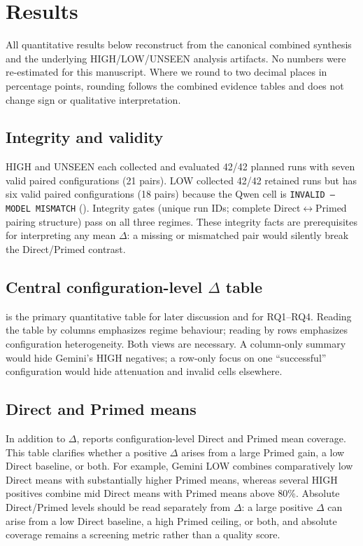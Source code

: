 \section{Results}
\label{sec:results}

All quantitative results below reconstruct from the canonical combined synthesis and the underlying HIGH/LOW/UNSEEN analysis artifacts.
No numbers were re-estimated for this manuscript.
Where we round to two decimal places in percentage points, rounding follows the combined evidence tables and does not change sign or qualitative interpretation.

\subsection{Integrity and validity}
HIGH and UNSEEN each collected and evaluated 42/42 planned runs with seven valid paired configurations (21 pairs).
LOW collected 42/42 retained runs but has six valid paired configurations (18 pairs) because the Qwen cell is \texttt{INVALID --- MODEL MISMATCH} ().
Integrity gates (unique run IDs; complete Direct$\leftrightarrow$Primed pairing structure) pass on all three regimes.
These integrity facts are prerequisites for interpreting any mean $\Delta$: a missing or mismatched pair would silently break the Direct/Primed contrast.

\subsection{Central configuration-level $\Delta$ table}
 is the primary quantitative table for later discussion and for RQ1--RQ4.
Reading the table by columns emphasizes regime behaviour; reading by rows emphasizes configuration heterogeneity.
Both views are necessary.
A column-only summary would hide Gemini's HIGH negatives; a row-only focus on one ``successful'' configuration would hide attenuation and invalid cells elsewhere.



\subsection{Direct and Primed means}
In addition to $\Delta$,  reports configuration-level Direct and Primed mean coverage.
This table clarifies whether a positive $\Delta$ arises from a large Primed gain, a low Direct baseline, or both.
For example, Gemini LOW combines comparatively low Direct means with substantially higher Primed means, whereas several HIGH positives combine mid Direct means with Primed means above 80\%.
Absolute Direct/Primed levels should be read separately from $\Delta$: a large positive $\Delta$ can arise from a low Direct baseline, a high Primed ceiling, or both, and absolute coverage remains a screening metric rather than a quality score.



